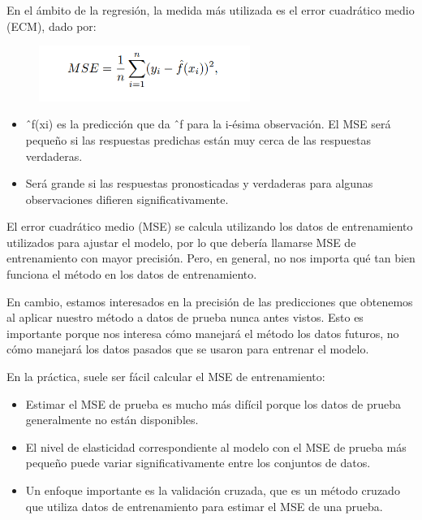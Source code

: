 \documentclass[
  letterpaper,
  DIV=11,
  numbers=noendperiod]{scrartcl}
\begin{document}
En el ámbito de la regresión, la medida más utilizada es el error
cuadrático medio (ECM), dado por:

\begin{figure}

{\centering \includegraphics[width=2.70833in,height=\textheight]{images/figura4.png}

}

\end{figure}

\begin{itemize}
\item
  ˆf(xi) es la predicción que da ˆf para la i-ésima observación. El MSE
  será pequeño si las respuestas predichas están muy cerca de las
  respuestas verdaderas.
\item
  Será grande si las respuestas pronosticadas y verdaderas para algunas
  observaciones difieren significativamente.
\end{itemize}

El error cuadrático medio (MSE) se calcula utilizando los datos de
entrenamiento utilizados para ajustar el modelo, por lo que debería
llamarse MSE de entrenamiento con mayor precisión. Pero, en general, no
nos importa qué tan bien funciona el método en los datos de
entrenamiento.

En cambio, estamos interesados \hspace{0pt}\hspace{0pt}en la precisión
de las predicciones que obtenemos al aplicar nuestro método a datos de
prueba nunca antes vistos. Esto es importante porque nos interesa cómo
manejará el método los datos futuros, no cómo manejará los datos pasados
\hspace{0pt}\hspace{0pt}que se usaron para entrenar el modelo.

En la práctica, suele ser fácil calcular el MSE de entrenamiento:

\begin{itemize}
\item
  Estimar el MSE de prueba es mucho más difícil porque los datos de
  prueba generalmente no están disponibles.
\item
  El nivel de elasticidad correspondiente al modelo con el MSE de prueba
  más pequeño puede variar significativamente entre los conjuntos de
  datos.
\item
  Un enfoque importante es la validación cruzada, que es un método
  cruzado que utiliza datos de entrenamiento para estimar el MSE de una
  prueba.
\end{itemize}
\end{document}
